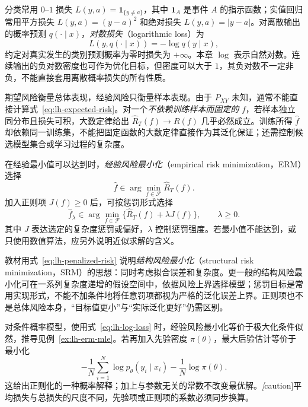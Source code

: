 分类常用 $0$--$1$ 损失 $L(y,a)=\mathbf1_{\{y\ne a\}}$，其中 $\mathbf1_A$ 是事件 $A$ 的指示函数；实值回归常用平方损失 $L(y,a)=(y-a)^2$ 和绝对损失 $L(y,a)=|y-a|$。对离散输出的概率预测 $q(\cdot\mid x)$，\emph{对数损失}（logarithmic loss）为
\begin{equation}
    L(y,q(\cdot\mid x))=-\log q(y\mid x),
    \label{eq:lh-log-loss}
\end{equation}
约定对真实发生的类别预测概率为零时损失为 $+\infty$。本章 $\log$ 表示自然对数。连续输出的负对数密度也可作为优化目标，但密度可以大于 $1$，其负对数不一定非负，不能直接套用离散概率损失的所有性质。

期望风险衡量总体表现，经验风险只衡量样本表现。由于 $P_{XY}$ 未知，通常不能直接计算式~\eqref{eq:lh-expected-risk}。对一个\emph{不依赖训练样本而固定的} $f$，若样本独立同分布且损失可积，大数定律给出 $\widehat R_T(f)\to R(f)$ 几乎必然成立。训练所得 $\widehat f$ 却依赖同一训练集，不能把固定函数的大数定律直接作为其泛化保证；还需控制候选模型集合或学习过程的复杂度。

\begin{definition}
\label{def:lh-erm-srm}
在经验最小值可以达到时，\emph{经验风险最小化}（empirical risk minimization，ERM）选择
\begin{equation}
    \widehat f\in\arg\min_{f\in\mathcal F}\widehat R_T(f).
    \label{eq:lh-erm}
\end{equation}
加入正则项 $J(f)\geq0$ 后，可按惩罚形式选择
\begin{equation}
    \widehat f_\lambda\in\arg\min_{f\in\mathcal F}
      \{\widehat R_T(f)+\lambda J(f)\},\qquad\lambda\geq0.
    \label{eq:lh-penalized-risk}
\end{equation}
其中 $J$ 表达选定的复杂度惩罚或偏好，$\lambda$ 控制惩罚强度。若最小值不能达到，或只使用数值算法，应另外说明近似求解的含义。
\end{definition}

教材用式~\eqref{eq:lh-penalized-risk} 说明\emph{结构风险最小化}（structural risk minimization，SRM）的思想：同时考虑拟合误差和复杂度。更一般的结构风险最小化可在一系列复杂度递增的假设空间中，依据风险上界选择模型；惩罚目标是常用实现形式，不能不加条件地将任意罚项都视为严格的泛化误差上界。正则项也不是总体风险本身，“目标值更小”与“实际泛化更好”仍需区别。

对条件概率模型，使用式~\eqref{eq:lh-log-loss} 时，经验风险最小化等价于极大化条件似然，推导见例~\ref{ex:lh-erm-mle}。若再加入先验密度 $\pi(\theta)$，最大后验估计等价于最小化
\begin{equation}
    -\frac1N\sum_{i=1}^N\log p_\theta(y_i\mid x_i)
    -\frac1N\log\pi(\theta).
    \label{eq:lh-map-penalty}
\end{equation}
这给出正则化的一种概率解释；加上与参数无关的常数不改变最优解。\emph[caution]{平均损失与总损失的尺度不同，先验项或正则项的系数必须同步换算。}

